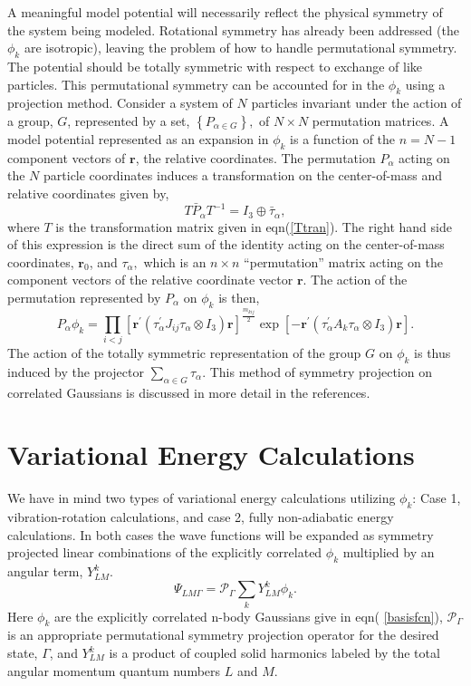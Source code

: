 \documentclass[12pt,thmsa]{article}
\begin{document}
A meaningful model potential will necessarily reflect the physical symmetry
of the system being modeled. Rotational symmetry has already been addressed
(the $\phi _k$ are isotropic), leaving the problem of how to handle
permutational symmetry. The potential should be totally symmetric with
respect to exchange of like particles. This permutational symmetry can be
accounted for in the $\phi _k$ using a projection method. Consider a system
of $N$ particles invariant under the action of a group, $G$, represented by
a set, $\left\{ P_{\alpha \in G}\right\} ,$ of $N\times N$ permutation
matrices. A model potential represented as an expansion in $\phi _k$ is a
function of the $n=N-1$ component vectors of $\mathbf{r}$, the relative
coordinates. The permutation $P_\alpha $ acting on the $N$ particle
coordinates induces a transformation on the center-of-mass and relative
coordinates given by, 
\begin{equation}
T\bar{P}_\alpha T^{-1}=I_3\oplus \bar{\tau}_\alpha ,
\end{equation}
where $T$ is the transformation matrix given in eqn(\ref{Ttran}). The right
hand side of this expression is the direct sum of the identity acting on the
center-of-mass coordinates, $\mathbf{r}_0$, and $\tau _\alpha ,$ which is an 
$n\times n$ ``permutation'' matrix acting on the component vectors of the
relative coordinate vector $\mathbf{r}$. The action of the permutation
represented by $P_\alpha $ on $\phi _k$ is then, 
\begin{equation}
P_\alpha \phi _k=\prod_{i<j}\left[ \mathbf{r}^{\prime }(\tau _\alpha
^{\prime }J_{ij}\tau _\alpha \otimes I_3)\mathbf{r}\right] ^{\frac{m_{kij}}%
2}\exp \left[ -\mathbf{r}^{\prime }(\tau _\alpha ^{\prime }A_k\tau _\alpha
\otimes I_3)\mathbf{r}\right] .
\end{equation}
The action of the totally symmetric representation of the group $G$ on $\phi
_k$ is thus induced by the projector $\sum_{\alpha \in G}\tau _\alpha .$
This method of symmetry projection on correlated Gaussians is discussed in
more detail in the references\cite{Poshusta83,Kinghorn93,Kinghorn95b}.

\section{Variational Energy Calculations}

We have in mind two types of variational energy calculations utilizing $\phi
_k$: Case 1, vibration-rotation calculations, and case 2, fully
non-adiabatic energy calculations. In both cases the wave functions will be
expanded as symmetry projected linear combinations of the explicitly
correlated $\phi _k$ multiplied by an angular term, $Y_{LM}^k.$ 
\begin{equation}
\Psi _{LM\Gamma }=\mathcal{P}_\Gamma \sum_kY_{LM}^k\phi _k.  \label{wf}
\end{equation}
Here $\phi _k$ are the explicitly correlated n-body Gaussians give in eqn(%
\ref{basisfcn}), $\mathcal{P}_\Gamma $ is an appropriate permutational
symmetry projection operator for the desired state, $\Gamma $, and $Y_{LM}^k$
is a product of coupled solid harmonics labeled by the total angular
momentum quantum numbers $L$ and $M$.
\end{document}
